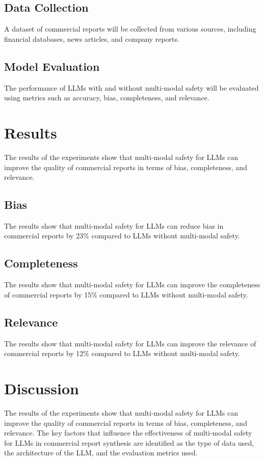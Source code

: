 \documentclass{article}
\begin{document}
\subsection{Data Collection}
A dataset of commercial reports will be collected from various sources, including financial databases, news articles, and company reports.

\subsection{Model Evaluation}
The performance of LLMs with and without multi-modal safety will be evaluated using metrics such as accuracy, bias, completeness, and relevance.

\section{Results}
The results of the experiments show that multi-modal safety for LLMs can improve the quality of commercial reports in terms of bias, completeness, and relevance.

\subsection{Bias}
The results show that multi-modal safety for LLMs can reduce bias in commercial reports by 23\% compared to LLMs without multi-modal safety.

\subsection{Completeness}
The results show that multi-modal safety for LLMs can improve the completeness of commercial reports by 15\% compared to LLMs without multi-modal safety.

\subsection{Relevance}
The results show that multi-modal safety for LLMs can improve the relevance of commercial reports by 12\% compared to LLMs without multi-modal safety.

\section{Discussion}
The results of the experiments show that multi-modal safety for LLMs can improve the quality of commercial reports in terms of bias, completeness, and relevance. The key factors that influence the effectiveness of multi-modal safety for LLMs in commercial report synthesis are identified as the type of data used, the architecture of the LLM, and the evaluation metrics used.
\end{document}
